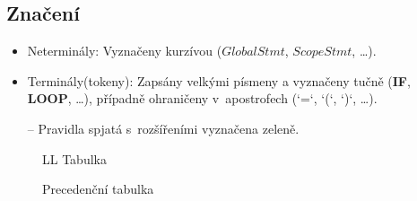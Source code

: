\documentclass[a4paper,11pt,leqno]{article}
\begin{document}
\begin{landscape}
\section*{Značení}
\begin{itemize}
\item{Neterminály: Vyznačeny kurzívou ($GlobalStmt$, $ScopeStmt$, \dots).}
\item{Terminály(tokeny): Zapsány velkými písmeny a vyznačeny tučně (\textbf{IF}, \textbf{LOOP}, \dots), případně ohraničeny v~apostrofech (`=`, `(`, `)`, \dots).}
\item[--]{Pravidla spjatá s~rozšířeními vyznačena \textcolor{green1}{zeleně}.}
\end{itemize}
\begin{figure}[ht]
	\begin{center}
		\caption{LL Tabulka}
		\label{pic_ll_table}
	\end{center}
\end{figure}
\begin{figure}[ht]
	\begin{center}
		\caption{Precedenční tabulka}
		\label{pic_prec}
	\end{center}
\end{figure}
\end{landscape}
\enddocument
\end{document}
